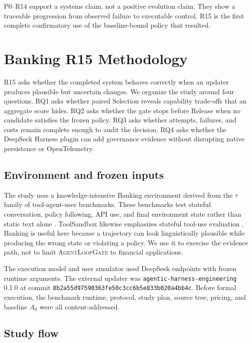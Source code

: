 \documentclass[10pt,twocolumn]{article}
\newcommand{\system}{\textsc{AgentLoopGate}\xspace}
\newcommand{\code}[1]{\texttt{#1}}
\begin{document}
P0--R14 support a systems claim, not a positive evolution claim. They show a
traceable progression from observed failure to executable control. R15 is the
first complete confirmatory use of the baseline-bound policy that resulted.

\section{Banking R15 Methodology}

R15 asks whether the completed system behaves correctly when an updater
produces plausible but uncertain changes. We organize the study around four
questions. RQ1 asks whether paired Selection reveals capability trade-offs that
an aggregate score hides. RQ2 asks whether the gate stops before Release when
no candidate satisfies the frozen policy. RQ3 asks whether attempts, failures,
and costs remain complete enough to audit the decision. RQ4 asks whether the
DeepSeek Harness plugin can add governance evidence without disrupting native
persistence or OpenTelemetry.

\subsection{Environment and frozen inputs}

The study uses a knowledge-intensive Banking environment derived from the
$\tau$ family of tool-agent-user benchmarks. These benchmarks test stateful
conversation, policy following, API use, and final environment state rather
than static text alone \cite{yao2024taubench}. ToolSandbox likewise emphasizes
stateful tool-use evaluation \cite{lu2024toolsandbox}. Banking is useful here
because a trajectory can look linguistically plausible while producing the
wrong state or violating a policy. We use it to exercise the evidence path,
not to limit \system to financial applications.

The execution model and user simulator used DeepSeek endpoints with frozen
runtime arguments. The external updater was
\code{agentic-harness-engineering} 0.1.0 at commit
\code{8b2a55d97590363fe50c3cc6b5e833b020a4bb4c}. Before formal execution, the
benchmark runtime, protocol, study plan, source tree, pricing, and baseline
$A_0$ were all content-addressed.

\subsection{Study flow}
\end{document}
